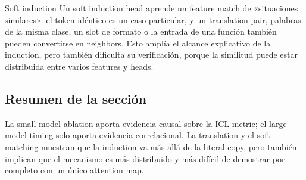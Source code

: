\begin{importantbox}{Soft induction}
Un soft induction head aprende un feature match de «situaciones similares»: el token idéntico es un caso particular, y un translation pair, palabras de la misma clase, un slot de formato o la entrada de una función también pueden convertirse en neighbors. Esto amplía el alcance explicativo de la induction, pero también dificulta su verificación, porque la similitud puede estar distribuida entre varios features y heads.
\end{importantbox}


\subsection{Resumen de la sección}

La small-model ablation aporta evidencia causal sobre la ICL metric; el large-model timing solo aporta evidencia correlacional. La translation y el soft matching muestran que la induction va más allá de la literal copy, pero también implican que el mecanismo es más distribuido y más difícil de demostrar por completo con un único attention map.

